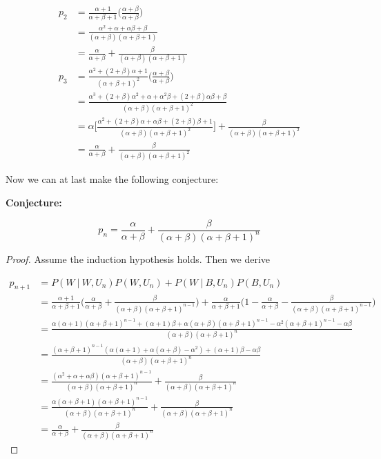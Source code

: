 \documentclass[10pt, oneside]{article}   	%
\theoremstyle{definition}
\begin{document}
\begin{enumerate}[label=3.\arabic*]
\begin{align*}
p_2 &= \frac{\alpha + 1}{\alpha + \beta + 1} \bigg( \frac{\alpha + \beta}{\alpha + \beta} \bigg) \\
&= \frac{\alpha^2 + \alpha + \alpha \beta + \beta}{(\alpha + \beta)(\alpha + \beta + 1)} \\
&= \boxed{ \frac{\alpha}{\alpha + \beta} + \frac{\beta}{(\alpha + \beta)(\alpha + \beta + 1)} } \\
p_3 &= \frac{\alpha^2 + (2 + \beta)\alpha + 1}{(\alpha + \beta + 1)^2} \bigg( \frac{\alpha + \beta}{\alpha + \beta} \bigg) \\
&= \frac{\alpha^3 + (2+\beta)\alpha^2 + \alpha + \alpha^2 \beta + (2+\beta) \alpha \beta + \beta}{(\alpha + \beta)(\alpha + \beta + 1)^2} \\
&= \alpha \bigg[ \frac{\alpha^2 + (2+\beta)\alpha + \alpha \beta + (2+\beta) \beta + 1}{(\alpha + \beta)(\alpha + \beta + 1)^2} \bigg] + \frac{\beta}{(\alpha + \beta)(\alpha + \beta + 1)^2} \\
&= \boxed{ \frac{\alpha}{\alpha + \beta} + \frac{\beta}{(\alpha + \beta)(\alpha + \beta + 1)^2} }
\end{align*}

Now we can at last make the following conjecture:

\textbf{Conjecture:}

\[ p_n = \frac{\alpha}{\alpha + \beta} + \frac{\beta}{(\alpha + \beta)(\alpha + \beta + 1)^n} \]

\begin{proof}
Assume the induction hypothesis holds. Then we derive

\begin{align*}
p_{n+1} &= P(W \ | \ W, U_n) P(W, U_n) + P(W \ | \ B, U_n) P(B, U_n) \\
&= \frac{\alpha + 1}{\alpha + \beta + 1} \bigg( \frac{\alpha}{\alpha + \beta} + \frac{\beta}{(\alpha + \beta) (\alpha + \beta + 1)^{n-1}} \bigg) + \frac{\alpha}{\alpha + \beta + 1} \bigg( 1 - \frac{\alpha}{\alpha + \beta} - \frac{\beta}{(\alpha + \beta)(\alpha + \beta + 1)^{n-1}} \bigg) \\
&= \frac{\alpha (\alpha + 1) (\alpha + \beta + 1)^{n-1} + (\alpha + 1)\beta + \alpha (\alpha + \beta)(\alpha + \beta + 1)^{n-1} - \alpha^2 (\alpha + \beta + 1)^{n-1} - \alpha \beta}{(\alpha + \beta)(\alpha + \beta + 1)^n} \\
&= \frac{(\alpha + \beta + 1)^{n-1} (\alpha (\alpha + 1) + \alpha (\alpha + \beta) - \alpha^2) + (\alpha + 1)\beta - \alpha \beta}{(\alpha + \beta)(\alpha + \beta + 1)^n} \\
&= \frac{(\alpha^2 + \alpha + \alpha \beta)(\alpha + \beta + 1)^{n-1}}{(\alpha + \beta)(\alpha + \beta + 1)^n} + \frac{\beta}{(\alpha + \beta)(\alpha + \beta + 1)^n} \\
&= \frac{\alpha (\alpha + \beta + 1)(\alpha + \beta + 1)^{n-1}}{(\alpha + \beta)(\alpha + \beta + 1)^n} + \frac{\beta}{(\alpha + \beta)(\alpha + \beta + 1)^n} \\
&= \boxed{ \frac{\alpha}{\alpha + \beta} + \frac{\beta}{(\alpha + \beta)(\alpha + \beta + 1)^n} }
\end{align*}


\end{proof}
\end{enumerate}
\end{document}
